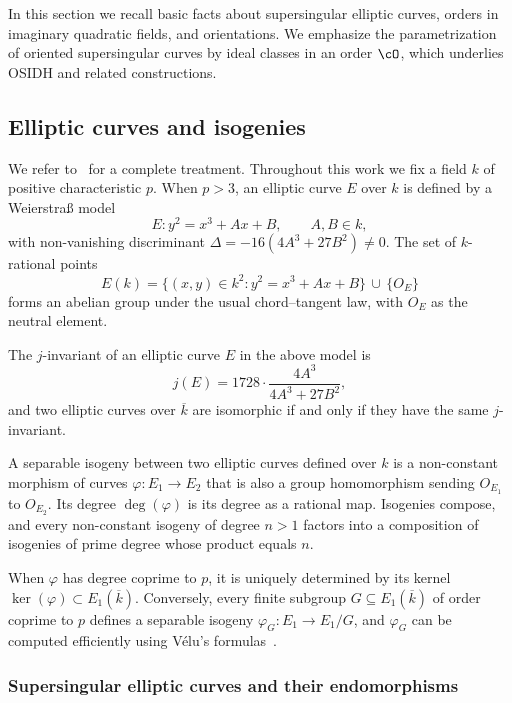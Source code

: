 \documentclass[10pt]{amsart}
\theoremstyle{theostyle}
\begin{document}
In this section we recall basic facts about supersingular elliptic curves,
orders in imaginary quadratic fields, and orientations. We emphasize the
parametrization of oriented supersingular curves by ideal classes in an order
$\cO$, which underlies OSIDH \cite{OSIDH} and related constructions.

\subsection{Elliptic curves and isogenies}

We refer to~\cite{Silverman:ArithmeticEC} for a complete treatment. Throughout this work
we fix a field $k$ of positive characteristic $p$. When
$p>3$, an elliptic curve $E$ over $k$ is defined by a Weierstraß model
\[
E: y^2 = x^3 + Ax + B,\qquad A,B\in k,
\]
with non-vanishing discriminant $\Delta = -16(4A^3+27B^2)\neq 0$. The set
of $k$-rational points
\[
E(k)=\{(x,y)\in k^2 : y^2 = x^3 + Ax + B\}\,\cup\,\{O_E\}
\]
forms an abelian group under the usual chord--tangent law, with
$O_E$ as the neutral element.

The $j$-invariant of an elliptic curve $E$ in the above model is
\[
j(E) = 1728\cdot \frac{4A^3}{4A^3+27B^2},
\]
and two elliptic curves over $\overline{k}$ are isomorphic if and only if
they have the same $j$-invariant.

A separable isogeny between two elliptic curves defined over $k$
is a non-constant morphism of curves $\varphi: E_1 \longrightarrow E_2$
that is also a group homomorphism sending $O_{E_1}$ to $O_{E_2}$.
Its degree $\deg(\varphi)$ is its degree as a rational map. Isogenies
compose, and every non-constant isogeny of degree $n>1$ factors into a
composition of isogenies of prime degree whose product equals $n$.



When $\varphi$ has degree coprime to $p$, it is uniquely
determined by its kernel $\ker(\varphi)\subset E_1(\overline{k})$.
Conversely, every finite subgroup $G\subseteq E_1(\overline{k})$ of order
coprime to $p$ defines a separable isogeny
$\varphi_G:E_1\to E_1/G$, and $\varphi_G$ can be computed efficiently using
Vélu's formulas~\cite{Velu:Isogenies}.



\subsubsection*{Supersingular elliptic curves and their endomorphisms}
\end{document}
